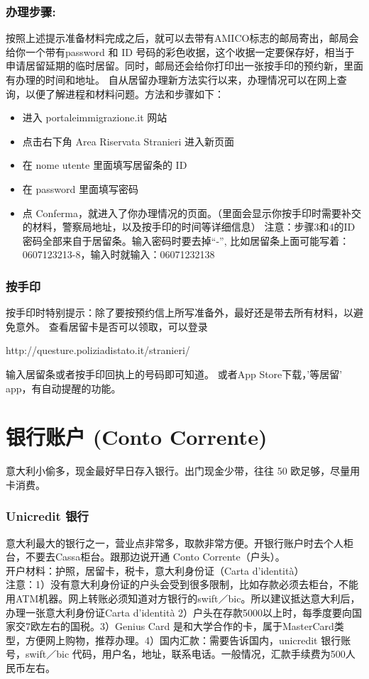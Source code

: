 \subsubsection{办理步骤:}
按照上述提示准备材料完成之后，就可以去带有AMICO标志的邮局寄出，邮局会给你一个带有password 和 ID 号码的彩色收据，这个收据一定要保存好，相当于申请居留延期的临时居留。同时，邮局还会给你打印出一张按手印的预约新，里面有办理的时间和地址。
自从居留办理新方法实行以来，办理情况可以在网上查询，以便了解进程和材料问题。方法和步骤如下：
\begin{itemize} 
\item 进入 portaleimmigrazione.it 网站
\item 点击右下角 Area Riservata Stranieri 进入新页面
\item 在 nome utente 里面填写居留条的 ID
\item 在 password 里面填写密码
\item 点 Conferma，就进入了你办理情况的页面。（里面会显示你按手印时需要补交的材料，警察局地址，以及按手印的时间等详细信息）
注意：步骤3和4的ID密码全部来自于居留条。输入密码时要去掉“-”, 比如居留条上面可能写着： 0607123213-8，输入时就输入：06071232138
\end{itemize}

\subsubsection{按手印}
按手印时特别提示：除了要按预约信上所写准备外，最好还是带去所有材料，以避免意外。
查看居留卡是否可以领取，可以登录

http://questure.poliziadistato.it/stranieri/

输入居留条或者按手印回执上的号码即可知道。
或者App Store下载，’等居留’ app，有自动提醒的功能。


\section{银行账户 (Conto Corrente)}

意大利小偷多，现金最好早日存入银行。出门现金少带，往往 50 欧足够，尽量用卡消费。
\subsubsection{Unicredit 银行}

意大利最大的银行之一，营业点非常多，取款非常方便。开银行账户时去个人柜台，不要去Cassa柜台。跟那边说开通 Conto Corrente（户头）。\\
开户材料：护照，居留卡，税卡，意大利身份证（Carta d’identità）\\
注意：1）没有意大利身份证的户头会受到很多限制，比如存款必须去柜台，不能用ATM机器。网上转账必须知道对方银行的swift／bic。所以建议抵达意大利后，办理一张意大利身份证Carta d’identità 2）户头在存款5000以上时，每季度要向国家交7欧左右的国税。3）Genius Card 是和大学合作的卡，属于MasterCard类型，方便网上购物，推荐办理。4）国内汇款：需要告诉国内，unicredit 银行账号，swift／bic 代码，用户名，地址，联系电话。一般情况，汇款手续费为500人民币左右。

